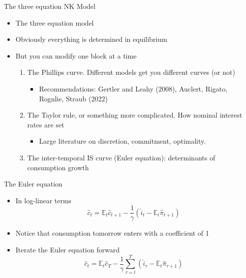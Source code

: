 \documentclass[english,xcolor=svgnames]{beamer}
\begin{document}
\begin{frame}{The three equation NK Model}
\begin{itemize}
\item The three equation model
\item Obviously everything is determined in equilibrium
\item But you can modify one block at a time
\begin{enumerate}
\item The Phillips curve. Different models get you different curves (or not)
\begin{itemize}
\item Recommendations: Gertler and Leahy (2008), Auclert, Rigato, Rognlie, Straub (2022)
\end{itemize}
\item The Taylor rule, or something more complicated. How nominal interest rates are set
\begin{itemize}
\item Large literature on discretion, commitment, optimality.
\end{itemize}
\item The inter-temporal IS curve (Euler equation): determinants of consumption growth
\end{enumerate}
\end{itemize}
\end{frame}


\begin{frame}{The Euler equation}
\begin{itemize}
\item In log-linear terms
\[\hat{c}_t = \mathbb{E}_t \hat{c}_{t+1} - \frac{1}{\gamma} (\hat{i}_t - \mathbb{E}_t \hat{\pi}_{t+1})\]
\item Notice that consumption tomorrow enters with a coefficient of 1
\item Iterate the Euler equation forward
\[\hat{c}_t = \mathbb{E}_t \hat{c}_{T} - \frac{1}{\gamma} \sum_{\tau = t}^{T} (\hat{i}_{\tau} - \mathbb{E}_t \hat{\pi}_{\tau+1})\]
\end{itemize}
\end{frame}
\end{document}
